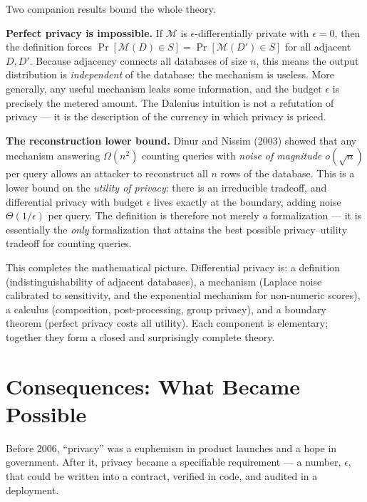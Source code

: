 Two companion results bound the whole theory. 

\textbf{Perfect privacy is impossible.} If $\mathcal{M}$ is $\epsilon$-differentially private with $\epsilon = 0$, then the definition forces $\Pr[\mathcal{M}(D) \in S] = \Pr[\mathcal{M}(D') \in S]$ for all adjacent $D, D'$. Because adjacency connects all databases of size $n$, this means the output distribution is \emph{independent} of the database: the mechanism is useless. More generally, any useful mechanism leaks some information, and the budget $\epsilon$ is precisely the metered amount. The Dalenius intuition is not a refutation of privacy --- it is the description of the currency in which privacy is priced.

\textbf{The reconstruction lower bound.} Dinur and Nissim (2003) showed that any mechanism answering $\Omega(n^2)$ counting queries with \emph{noise of magnitude $o(\sqrt{n})$} per query allows an attacker to reconstruct all $n$ rows of the database.  This is a lower bound on the \emph{utility of privacy}: there is an irreducible tradeoff, and differential privacy with budget $\epsilon$ lives exactly at the boundary, adding noise $\Theta(1/\epsilon)$ per query. The definition is therefore not merely \emph{a} formalization --- it is essentially the \emph{only} formalization that attains the best possible privacy--utility tradeoff for counting queries. \cite{dwork2014}

This completes the mathematical picture. Differential privacy is: a definition (indistinguishability of adjacent databases), a mechanism (Laplace noise calibrated to sensitivity, and the exponential mechanism for non-numeric scores), a calculus (composition, post-processing, group privacy), and a boundary theorem (perfect privacy costs all utility). Each component is elementary; together they form a closed and surprisingly complete theory.

\section{Consequences: What Became Possible}
\label{sec:dp:consequences}

Before 2006, ``privacy'' was a euphemism in product launches and a hope in government. After it, privacy became a specifiable requirement --- a number, $\epsilon$, that could be written into a contract, verified in code, and audited in a deployment. 

